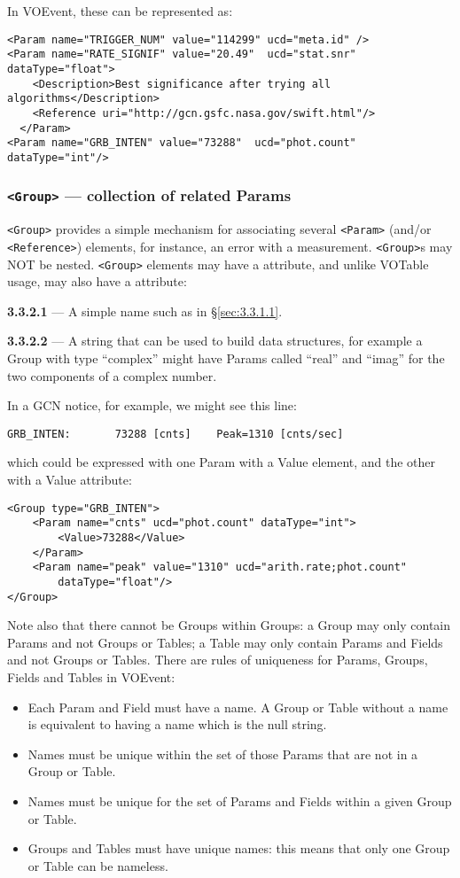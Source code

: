 \documentclass[11pt,a4paper]{ivoa}
\begin{document}
In VOEvent, these can be represented as:
\begin{lstlisting}
<Param name="TRIGGER_NUM" value="114299" ucd="meta.id" />
<Param name="RATE_SIGNIF" value="20.49"  ucd="stat.snr" dataType="float">
    <Description>Best significance after trying all algorithms</Description>
    <Reference uri="http://gcn.gsfc.nasa.gov/swift.html"/>
  </Param>
<Param name="GRB_INTEN" value="73288"  ucd="phot.count" dataType="int"/>
\end{lstlisting}

\subsubsection{\texttt{<Group>} --- collection of related Params}
\label{sec:3.3.2}
\verb|<Group>| provides a simple mechanism for associating several \verb|<Param>|
(and/or \verb|<Reference>|) elements, for instance, an error with a measurement.
\verb|<Group>|s may NOT be nested. \verb|<Group>| elements may have a
attribute, and unlike VOTable usage, may also have a  attribute:

\noindent \textbf{3.3.2.1} \label{sec:3.3.2.1} --- A simple name such as
in \S\ref{sec:3.3.1.1}.

\noindent \textbf{3.3.2.2} \label{sec:3.3.2.2} --- A string that can be
used to build data structures, for example a Group with type ``complex'' might
have Params called ``real'' and ``imag'' for the two components of a complex
number.

In a GCN notice, for example, we might see this line:
\begin{lstlisting}
GRB_INTEN:       73288 [cnts]    Peak=1310 [cnts/sec]
\end{lstlisting}
which could be expressed with one Param with a Value element, and the other with
a Value attribute:
\begin{lstlisting}
<Group type="GRB_INTEN">
    <Param name="cnts" ucd="phot.count" dataType="int">
        <Value>73288</Value>
    </Param>
    <Param name="peak" value="1310" ucd="arith.rate;phot.count"
        dataType="float"/>
</Group>
\end{lstlisting}
Note also that there cannot be Groups within Groups: a Group may only contain
Params and not Groups or Tables; a Table may only contain Params and Fields and
not Groups or Tables. There are rules of uniqueness for Params, Groups, Fields
and Tables in VOEvent:
\begin{itemize}
\item Each Param and Field must have a name. A Group or Table without a name is
equivalent to having a name which is the null string.
\item Names must be unique within the set of those Params that are not in a
Group or Table.
\item Names must be unique for the set of Params and Fields within a given Group
or Table.
\item Groups and Tables must have unique names: this means that only one Group
or Table can be nameless.
\end{itemize}
\end{document}
